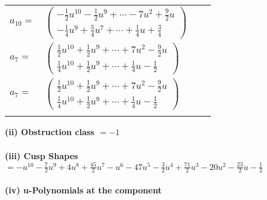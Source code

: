 \documentclass[1p]{elsarticle_modified}
\theoremstyle{definition}
\begin{document}
\begin{tabular}{m{7pt} m{180pt} m{7pt} m{180pt} }
\flushright $a_{10}=$&$\begin{pmatrix}-\frac{1}{2} u^{10}-\frac{1}{2} u^9+\cdots-7 u^2+\frac{9}{2} u\\-\frac{1}{4} u^9+\frac{5}{4} u^7+\cdots+\frac{1}{4} u+\frac{3}{4}\end{pmatrix}$ \\
\flushright $a_{7}=$&$\begin{pmatrix}\frac{1}{2} u^{10}+\frac{1}{2} u^9+\cdots+7 u^2-\frac{9}{2} u\\\frac{1}{4} u^{10}+\frac{1}{2} u^9+\cdots+\frac{1}{4} u-\frac{1}{2}\end{pmatrix}$\\ \flushright $a_{7}=$&$\begin{pmatrix}\frac{1}{2} u^{10}+\frac{1}{2} u^9+\cdots+7 u^2-\frac{9}{2} u\\\frac{1}{4} u^{10}+\frac{1}{2} u^9+\cdots+\frac{1}{4} u-\frac{1}{2}\end{pmatrix}$\\&\end{tabular}
\flushleft \textbf{(ii) Obstruction class $= -1$}\\~\\
\flushleft \textbf{(iii) Cusp Shapes $= - u^{10}-\frac{7}{2} u^9+4 u^8+\frac{45}{2} u^7- u^6-47 u^5-\frac{3}{2} u^4+\frac{71}{2} u^3-20 u^2-\frac{23}{2} u-\frac{1}{2}$}\\~\\
\newpage\renewcommand{\arraystretch}{1}
\flushleft \textbf{(iv) u-Polynomials at the component}\newline \\
\end{document}
